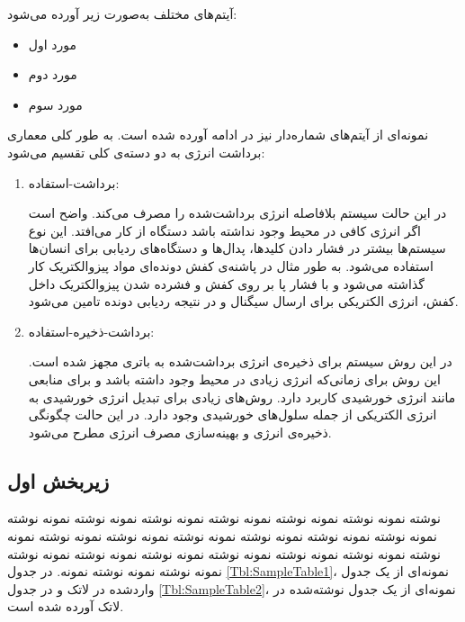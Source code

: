 آیتم‌های مختلف به‌صورت زیر آورده می‌شود:
\begin{itemize}[label=-]
\item
مورد اول
\item
مورد دوم
\item
مورد سوم
\end{itemize}

نمونه‌ای از آیتم‌های شماره‌دار نیز در ادامه آورده شده است. به طور کلی معماری برداشت انرژی به دو دسته‌ی کلی تقسیم می‌شود:
\begin{enumerate}[label=\arabic*)]
\item
برداشت-استفاده:

در این حالت سیستم بلافاصله انرژی برداشت‌شده را مصرف می‌کند. واضح است اگر انرژی کافی در محیط وجود نداشته باشد دستگاه از کار می‌افتد. این نوع سیستم‌ها بیشتر در فشار دادن کلید‌ها، پدال‌ها و دستگاه‌های ردیابی برای انسان‌ها استفاده می‌شود. به طور مثال در پاشنه‌ی کفش دونده‌ای مواد پیزوالکتریک کار گذاشته می‌شود و با فشار پا بر روی کفش و فشرده شدن پیزوالکتریک داخل کفش، انرژی الکتریکی برای ارسال سیگنال 
و در نتیجه ردیابی دونده تامین می‌شود. 
\item
برداشت-ذخیره-استفاده:

در این روش سیستم برای ذخیره‌ی انرژی برداشت‌شده به باتری مجهز شده است. این روش برای زمانی‌که انرژی زیادی در محیط وجود داشته باشد و برای منابعی مانند انرژی خورشیدی  کاربرد دارد. روش‌های زیادی برای تبدیل انرژی خورشیدی به انرژی الکتریکی از جمله سلول‌های خورشیدی وجود دارد. در این حالت چگونگی ذخیره‌ی انرژی و بهینه‌سازی مصرف انرژی مطرح می‌شود.
\end{enumerate}




\subsection{زیربخش اول}
نوشته نمونه نوشته نمونه نوشته نمونه نوشته نمونه نوشته نمونه نوشته نمونه نوشته نمونه نوشته نمونه نوشته نمونه نوشته نمونه نوشته نمونه نوشته نمونه نوشته نمونه نوشته نمونه نوشته نمونه نوشته نمونه نوشته نمونه نوشته نمونه نوشته نمونه نوشته نمونه نوشته نمونه نوشته نمونه. در جدول
\ref{Tbl:SampleTable1}،
نمونه‌ای از یک جدول واردشده در لاتک و در جدول
\ref{Tbl:SampleTable2}،
نمونه‌ای از یک جدول نوشته‌شده در لاتک آورده شده است.

